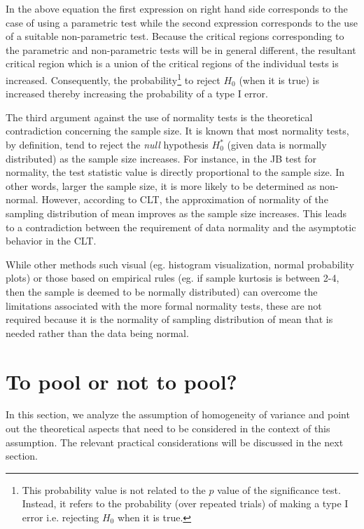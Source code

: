 \documentclass[10pt,final,Twcolumn]{IEEEtran}
\begin{document}
In the above equation the first expression on right hand side corresponds to the case of using a parametric test while the second expression corresponds to the use of a suitable non-parametric test. Because the critical regions corresponding to the parametric and non-parametric tests will be in general different, the resultant critical region which is a union of the critical regions of the individual tests is increased. Consequently, the probability\footnote{This probability value is not related to the $p$ value of the significance test. Instead, it refers to the probability (over repeated trials) of making a type I error i.e. rejecting $H_0$ when it is true.} to reject $H_0$ (when it is true) is increased thereby increasing the probability of a type I error. 

The third argument against the use of normality tests is the theoretical contradiction concerning the sample size. It is known that most normality tests, by definition, tend to reject the {\it{null}} hypothesis $H_0^{*}$ ({given data is normally distributed}) as the sample size increases. For instance, in the JB test for normality, the test statistic value is directly proportional to the sample size. In other words, larger the sample size, it is more likely to be determined as non-normal. However, according to CLT, the approximation of normality of the sampling distribution of mean improves as the sample size increases. This leads to a contradiction between the requirement of data normality and the asymptotic behavior in the CLT. 

While other methods such visual (eg. histogram visualization, normal probability plots) or those based on empirical rules (eg. if sample kurtosis is between 2-4, then the sample is deemed to be normally distributed) can overcome the limitations associated with the more formal normality tests, these are not required because it is the normality of sampling distribution of mean that is needed rather than the data being normal.

\section{To pool or not to pool?} \label{to pool or not to pool} \label{homogeneity of variance}
      
In this section, we analyze the assumption of homogeneity of variance and point out the theoretical aspects that need to be considered in the context of this assumption. The relevant practical considerations will be discussed in the next section.
\end{document}
